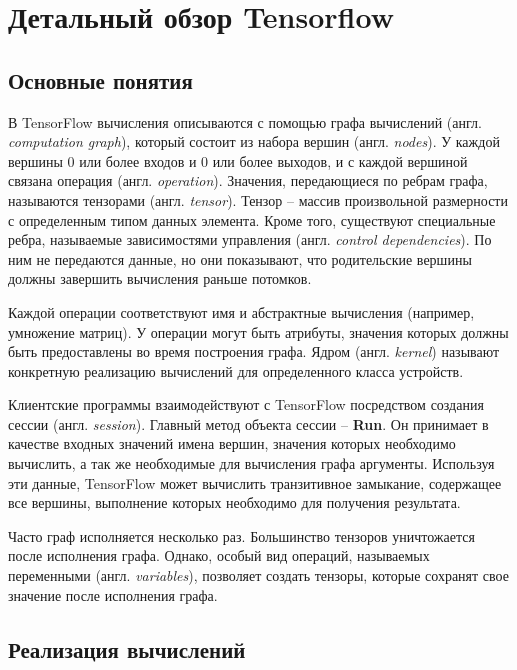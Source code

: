 \clearpage

\section{Детальный обзор Tensorflow}

\subsection{Основные понятия}

В TensorFlow вычисления описываются с помощью графа вычислений (англ.
\textit{computation graph}), который состоит из набора вершин (англ.
\textit{nodes}). У каждой вершины 0 или более входов и 0 или более выходов,
и с каждой вершиной связана операция (англ. \textit{operation}). Значения,
передающиеся по ребрам графа, называются тензорами (англ. \textit{tensor}).
Тензор -- массив произвольной размерности с определенным типом данных элемента.
Кроме того, существуют специальные ребра, называемые зависимостями управления
(англ. \textit{control dependencies}). По ним не передаются данные, но они
показывают, что родительские вершины должны завершить вычисления раньше потомков.

Каждой операции соответствуют имя и абстрактные вычисления (например, умножение
матриц). У операции могут быть атрибуты, значения которых должны быть
предоставлены во время построения графа. Ядром (англ. \textit{kernel}) называют
конкретную реализацию вычислений для определенного класса устройств.

Клиентские программы взаимодействуют с TensorFlow посредством создания сессии
(англ. \textit{session}). Главный метод объекта сессии -- \textbf{Run}. Он
принимает в качестве входных значений имена вершин, значения которых необходимо
вычислить, а так же необходимые для вычисления графа аргументы. Используя эти
данные, TensorFlow может вычислить транзитивное замыкание, содержащее все
вершины, выполнение которых необходимо для получения результата.

Часто граф исполняется несколько раз. Большинство тензоров уничтожается после
исполнения графа. Однако, особый вид операций, называемых переменными (англ.
\textit{variables}), позволяет создать тензоры, которые сохранят свое значение
после исполнения графа.

\subsection{Реализация вычислений}

